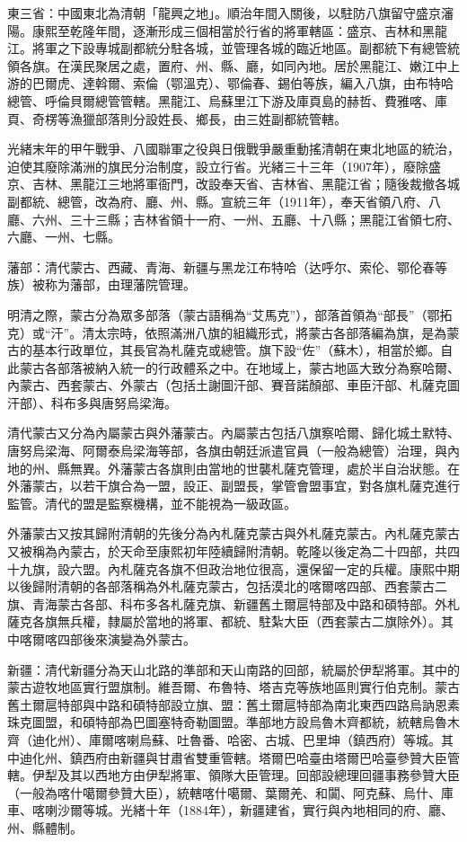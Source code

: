 東三省：中國東北為清朝「龍興之地」。順治年間入關後，以駐防八旗留守盛京瀋陽。康熙至乾隆年間，逐漸形成三個相當於行省的將軍轄區：盛京、吉林和黑龍江。將軍之下設專城副都統分駐各城，並管理各城的臨近地區。副都統下有總管統領各旗。在漢民聚居之處，置府、州、縣、廳，如同內地。居於黑龍江、嫩江中上游的巴爾虎、達斡爾、索倫（鄂溫克）、鄂倫春、錫伯等族，編入八旗，由布特哈總管、呼倫貝爾總管管轄。黑龍江、烏蘇里江下游及庫頁島的赫哲、費雅喀、庫頁、奇楞等漁獵部落則分設姓長、鄉長，由三姓副都統管轄。

光緒末年的甲午戰爭、八國聯軍之役與日俄戰爭嚴重動搖清朝在東北地區的統治，迫使其廢除滿洲的旗民分治制度，設立行省。光緒三十三年（1907年），廢除盛京、吉林、黑龍江三地將軍衙門，改設奉天省、吉林省、黑龍江省；隨後裁撤各城副都統、總管，改為府、廳、州、縣。宣統三年（1911年），奉天省領八府、八廳、六州、三十三縣；吉林省領十一府、一州、五廳、十八縣；黑龍江省領七府、六廳、一州、七縣。

藩部：清代蒙古、西藏、青海、新疆与黑龙江布特哈（达呼尔、索伦、鄂伦春等族）被称为藩部，由理藩院管理。

明清之際，蒙古分為眾多部落（蒙古語稱為“艾馬克”），部落首領為“部長”（鄂拓克）或“汗”。清太宗時，依照滿洲八旗的組織形式，將蒙古各部落編為旗，是為蒙古的基本行政單位，其長官為札薩克或總管。旗下設“佐”（蘇木），相當於鄉。自此蒙古各部落被納入統一的行政體系之中。在地域上，蒙古地區大致分為察哈爾、內蒙古、西套蒙古、外蒙古（包括土謝圖汗部、賽音諾顏部、車臣汗部、札薩克圖汗部）、科布多與唐努烏梁海。

清代蒙古又分為內屬蒙古與外藩蒙古。內屬蒙古包括八旗察哈爾、歸化城土默特、唐努烏梁海、阿爾泰烏梁海等部，各旗由朝廷派遣官員（一般為總管）治理，與內地的州、縣無異。外藩蒙古各旗則由當地的世襲札薩克管理，處於半自治狀態。在外藩蒙古，以若干旗合為一盟，設正、副盟長，掌管會盟事宜，對各旗札薩克進行監管。清代的盟是監察機構，並不能視為一級政區。

外藩蒙古又按其歸附清朝的先後分為內札薩克蒙古與外札薩克蒙古。內札薩克蒙古又被稱為內蒙古，於天命至康熙初年陸續歸附清朝。乾隆以後定為二十四部，共四十九旗，設六盟。內札薩克各旗不但政治地位很高，還保留一定的兵權。康熙中期以後歸附清朝的各部落稱為外札薩克蒙古，包括漠北的喀爾喀四部、西套蒙古二旗、青海蒙古各部、科布多各札薩克旗、新疆舊土爾扈特部及中路和碩特部。外札薩克各旗無兵權，隸屬於當地的將軍、都統、駐紮大臣（西套蒙古二旗除外）。其中喀爾喀四部後來演變為外蒙古。

新疆：清代新疆分為天山北路的準部和天山南路的回部，統屬於伊犁將軍。其中的蒙古遊牧地區實行盟旗制。維吾爾、布魯特、塔吉克等族地區則實行伯克制。蒙古舊土爾扈特部與中路和碩特部設立旗、盟：舊土爾扈特部為南北東西四路烏訥恩素珠克圖盟，和碩特部為巴圖塞特奇勒圖盟。準部地方設烏魯木齊都統，統轄烏魯木齊（迪化州）、庫爾喀喇烏蘇、吐魯番、哈密、古城、巴里坤（鎮西府）等城。其中迪化州、鎮西府由新疆與甘肅省雙重管轄。塔爾巴哈臺由塔爾巴哈臺參贊大臣管轄。伊犁及其以西地方由伊犁將軍、領隊大臣管理。回部設總理回疆事務參贊大臣（一般為喀什噶爾參贊大臣），統轄喀什噶爾、葉爾羌、和闐、阿克蘇、烏什、庫車、喀喇沙爾等城。光緒十年（1884年），新疆建省，實行與內地相同的府、廳、州、縣體制。

